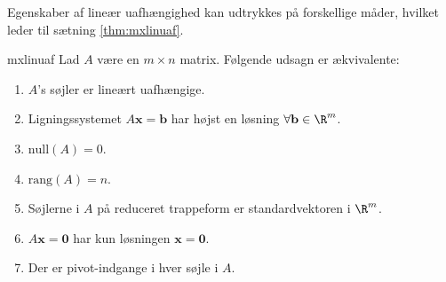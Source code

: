 %
%
%
Egenskaber af lineær uafhængighed kan udtrykkes på forskellige måder, hvilket leder til sætning \ref{thm:mxlinuaf}.
%
\begin{thm}{}{mxlinuaf}
%
Lad $A$ være en $m \times n$ matrix.
Følgende udsagn er ækvivalente:
%
\begin{enumerate}[label=(\alph*)]
\item $A$'s søjler er lineært uafhængige. 
\item Ligningssystemet $A\mathbf{x}=\mathbf{b}$ har højst en løsning $\forall \mathbf{b} \in \R^m$.
\item $\text{null}(A)=0$.
\item $\text{rang}(A)=n$.
\item Søjlerne i $A$ på reduceret trappeform er standardvektoren i $\R^m$.
\item $A\mathbf{x}=\mathbf{0}$ har kun løsningen $\mathbf{x}=\mathbf{0}$.                                                                                                                                                                                                                                                                                                                         
\item Der er pivot-indgange i hver søjle i $A$. 
\end{enumerate}
%
\end{thm}
%
%
